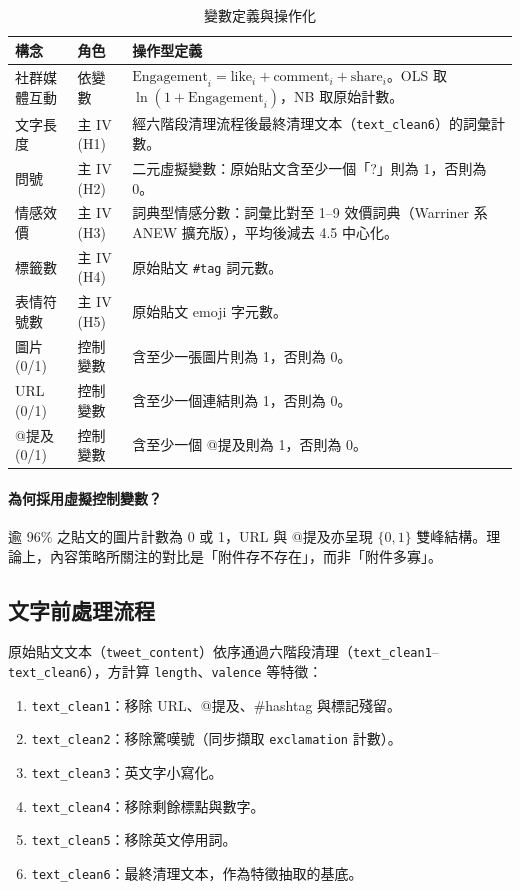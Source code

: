 \documentclass[12pt,a4paper]{ctexart}
\begin{document}
\begin{table}[H]
\centering
\caption{變數定義與操作化}
\small
\begin{tabular}{@{}p{} p{} p{}@{}}
\toprule
構念 & 角色 & 操作型定義 \\
\midrule
社群媒體互動 & 依變數 & $\text{Engagement}_i = \text{like}_i + \text{comment}_i + \text{share}_i$。OLS 取 $\ln(1+\text{Engagement}_i)$，NB 取原始計數。 \\
\midrule
文字長度 & 主 IV (H1) & 經六階段清理流程後最終清理文本（\texttt{text\_clean6}）的詞彙計數。 \\
問號 & 主 IV (H2) & 二元虛擬變數：原始貼文含至少一個「?」則為 1，否則為 0。 \\
情感效價 & 主 IV (H3) & 詞典型情感分數：詞彙比對至 1--9 效價詞典（Warriner 系 ANEW 擴充版），平均後減去 4.5 中心化。 \\
標籤數 & 主 IV (H4) & 原始貼文 \texttt{\#tag} 詞元數。 \\
表情符號數 & 主 IV (H5) & 原始貼文 emoji 字元數。 \\
\midrule
圖片 (0/1) & 控制變數 & 含至少一張圖片則為 1，否則為 0。 \\
URL (0/1) & 控制變數 & 含至少一個連結則為 1，否則為 0。 \\
@提及 (0/1) & 控制變數 & 含至少一個 @提及則為 1，否則為 0。 \\
\bottomrule
\end{tabular}
\end{table}

\paragraph{為何採用虛擬控制變數？}逾 96\% 之貼文的圖片計數為 0 或 1，URL 與 @提及亦呈現 $\{0,1\}$ 雙峰結構。理論上，內容策略所關注的對比是「附件存不存在」，而非「附件多寡」。

\subsection{文字前處理流程}
\label{sec:preproc}

原始貼文文本（\texttt{tweet\_content}）依序通過六階段清理（\texttt{text\_clean1}--\texttt{text\_clean6}），方計算 \texttt{length}、\texttt{valence} 等特徵：

\begin{enumerate}
    \item \texttt{text\_clean1}：移除 URL、@提及、\#hashtag 與標記殘留。
    \item \texttt{text\_clean2}：移除驚嘆號（同步擷取 \texttt{exclamation} 計數）。
    \item \texttt{text\_clean3}：英文字小寫化。
    \item \texttt{text\_clean4}：移除剩餘標點與數字。
    \item \texttt{text\_clean5}：移除英文停用詞。
    \item \texttt{text\_clean6}：最終清理文本，作為特徵抽取的基底。
\end{enumerate}
\end{document}
